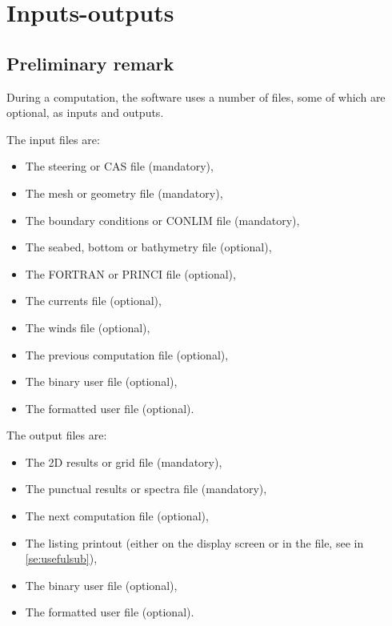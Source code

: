 \chapter{ Inputs-outputs}

\section{ Preliminary remark}

 During a computation, the \tomawac software uses a number of files, some of which are optional, as inputs and outputs.

 The input files are:

\begin{itemize}
\item  The steering or CAS file (mandatory),

\item  The mesh or geometry file (mandatory),

\item  The boundary conditions or CONLIM file (mandatory),

\item  The seabed, bottom or bathymetry file (optional),

\item  The FORTRAN or PRINCI file (optional),

\item  The currents file (optional),

\item  The winds file (optional),

\item  The previous computation file (optional),

\item  The binary user file (optional),

\item  The formatted user file (optional).
\end{itemize}

The output files are:

\begin{itemize}
\item  The 2D results or grid file (mandatory),
\item  The punctual results or spectra file (mandatory),
\item  The next computation file (optional),
\item  The listing printout (either on the display screen or in the file, see in \ref{se:usefulsub}),
\item  The binary user file (optional),
\item  The formatted user file (optional).
\end{itemize}

